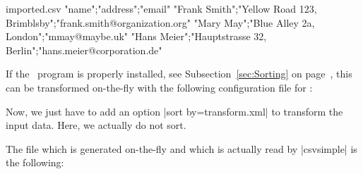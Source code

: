 \documentclass[a4paper,11pt]{ltxdoc}
\begin{document}
\begin{tcbverbatimwrite}{imported.csv}
"name";"address";"email"
"Frank Smith";"Yellow Road 123, Brimblsby";"frank.smith@organization.org"
"Mary May";"Blue Alley 2a, London";"mmay@maybe.uk"
"Hans Meier";"Hauptstrasse 32, Berlin";"hans.meier@corporation.de"
\end{tcbverbatimwrite}


If the \csvsorter\ program is properly installed,
see Subsection~\ref{sec:Sorting} on page~\pageref{sec:Sorting},
this can be transformed on-the-fly
with the following configuration file for \csvsorter:


Now, we just have to add an option |sort by=transform.xml| to transform
the input data. Here, we actually do not sort.

\begin{dispExample}
\newcommand{\Header}[1]{\normalfont\bfseries #1}

\csvreader[
  sort by=transform.xml,
  tabular=>{\itshape}ll>{\ttfamily}l,
  table head=\toprule\Header{Name} & \Header{Address} & \Header{email}\\\midrule,
  table foot=\bottomrule]
  {imported.csv}{}{\csvlinetotablerow}
\end{dispExample}

The file which is generated on-the-fly and which is actually read by
|csvsimple| is the following:



\clearpage
\end{document}

